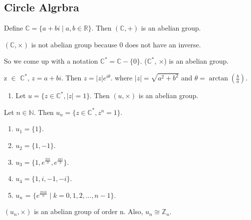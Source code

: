 \subsection{Circle Algrbra}
\begin{eg}
    Define $\mathbb{C} = \{a + bi \mid a, b \in \mathbb{R}\}$. Then $(\mathbb{C}, +)$ is an abelian group.
\end{eg}
\begin{remark}
    $(\mathbb{C}, \times)$ is not abelian group because 0 does not have an inverse. 
    \begin{note}
        So we come up with a notation $\mathbb{C}^{*} = \mathbb{C} - \{0\}$.
        ($\mathbb{C}^{*}$, $\times$) is an abelian group.
    \end{note}
\end{remark}

\begin{note}
    z $\in$ $\mathbb{C}^{*}$, $z = a + bi$. Then $z = |z|e^{i \theta}$.
    where $|z| = \sqrt{a^2 + b^2}$ and $\theta = \arctan(\frac{b}{a})$.
\end{note}

\begin{eg}
    \begin{enumerate}
        \item Let $u = \{z \in \mathbb{C}^{*}, |z| = 1\}$. Then $(u, \times)$ is an abelian group.
    \end{enumerate}
\end{eg}

\begin{eg}
    Let $n \in \mathbb{N}$. Then $u_n = \{z \in \mathbb{C}^{*}, z^n = 1\}$.
    \begin{enumerate}
        \item $u_1 = \{1\}$.
        \item $u_2 = \{1, -1\}$.
        \item $u_3 = \{1, e^{\frac{2\pi i}{3}}, e^{\frac{4\pi i}{3}}\}$.
        \item $u_4 = \{1, i, -1, -i\}$.
        \item $u_n$ = $\{e^{\frac{2\pi i k}{n}} \mid k = 0, 1, 2, \ldots, n-1\}$.
    \end{enumerate}

    \begin{note}
        $(u_n, \times)$ is an abelian group of order n.
        Also, $u_n \cong \mathbb{Z}_n$.
    \end{note}  
\end{eg}

